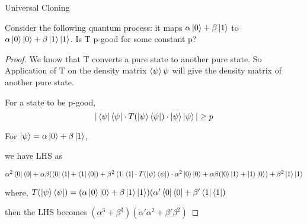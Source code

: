 \begin{solution}{Universal Cloning}\label{ques:x}
    \begin{question}
    Consider the following quantum process: it maps $\alpha \ket{0}+\beta\ket{1}$ to $\alpha \ket{0}\ket{0}+\beta\ket{1}\ket{1}$. Is T p-good for some constant p?
    \end{question}
    \tcblower{}
    \begin{proof}
    We know that T converts a pure state to another pure state. So Application of T on the density matrix $\braket{\psi}{\psi}$ will give the density matrix of another pure state.

    For a state to be p-good,
    \[|\bra{\psi}\bra{\psi}\cdot T(\ket{\psi}\bra{\psi})\cdot\ket{\psi}\ket{\psi}|\geq p\]

    For $\ket{\psi} = \alpha \ket{0}+\beta\ket{1}$,

    we have LHS as 

    $\alpha^2\bra{0}\bra{0}+\alpha\beta(\bra{0}\bra{1}+\bra{1}\bra{0})+\beta^2 \bra{1}\bra{1}\cdot T(\ket{\psi}\bra{\psi}) \cdot \alpha^2\ket{0}\ket{0}+\alpha\beta(\ket{0}\ket{1}+\ket{1}\ket{0})+\beta^2 \ket{1}\ket{1}$

    where,
    $T(\ket{\psi}\bra{\psi}) = (\alpha \ket{0}\ket{0}+\beta\ket{1}\ket{1})(\alpha' \bra{0}\bra{0}+\beta'\bra{1}\bra{1})$\newline

    then the LHS becomes $(\alpha^3+\beta^3)(\alpha'\alpha^2+\beta'\beta^2)$
    \end{proof}
\end{solution}
 